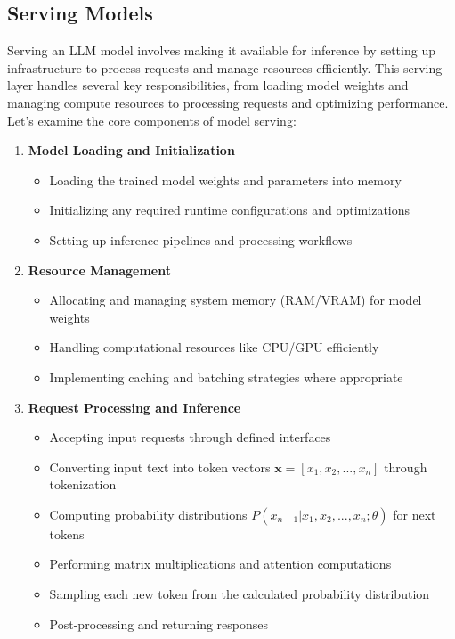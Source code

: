 \subsection{Serving Models}

Serving an LLM model involves making it available for inference by setting up infrastructure to process requests and manage resources efficiently. This serving layer handles several key responsibilities, from loading model weights and managing compute resources to processing requests and optimizing performance. Let's examine the core components of model serving:

\begin{enumerate}
\item \textbf{Model Loading and Initialization}
\begin{itemize}
    \item Loading the trained model weights and parameters into memory
    \item Initializing any required runtime configurations and optimizations
    \item Setting up inference pipelines and processing workflows
\end{itemize}

\item \textbf{Resource Management}
\begin{itemize}
    \item Allocating and managing system memory (RAM/VRAM) for model weights
    \item Handling computational resources like CPU/GPU efficiently
    \item Implementing caching and batching strategies where appropriate
\end{itemize}

\item \textbf{Request Processing and Inference}
\begin{itemize}
    \item Accepting input requests through defined interfaces
    \item Converting input text into token vectors $\mathbf{x} = [x_1, x_2, ..., x_n]$ through tokenization
    \item Computing probability distributions $P(x_{n+1}|x_1, x_2, ..., x_n; \theta)$ for next tokens
    \item Performing matrix multiplications and attention computations
    \item Sampling each new token from the calculated probability distribution
    \item Post-processing and returning responses
\end{itemize}


\end{enumerate}
